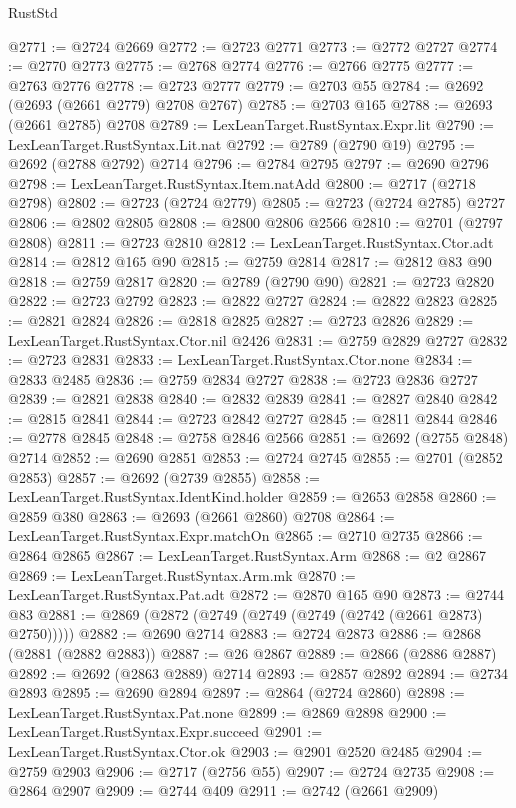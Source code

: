 \begin{lexlean}{RustStd}
\begin{coremodule}
{\begin{coremodule}
{{{{{{{{{{{{{{{{{{{{{{{{{{{{{{{{{{{{{{{@2771 := @2724 @2669
@2772 := @2723 @2771
@2773 := @2772 @2727
@2774 := @2770 @2773
@2775 := @2768 @2774
@2776 := @2766 @2775
@2777 := @2763 @2776
@2778 := @2723 @2777
@2779 := @2703 @55
@2784 := @2692 (@2693 (@2661 @2779) @2708 @2767)
@2785 := @2703 @165
@2788 := @2693 (@2661 @2785) @2708
@2789 := LexLeanTarget.RustSyntax.Expr.lit
@2790 := LexLeanTarget.RustSyntax.Lit.nat
@2792 := @2789 (@2790 @19)
@2795 := @2692 (@2788 @2792) @2714
@2796 := @2784 @2795
@2797 := @2690 @2796
@2798 := LexLeanTarget.RustSyntax.Item.natAdd
@2800 := @2717 (@2718 @2798)
@2802 := @2723 (@2724 @2779)
@2805 := @2723 (@2724 @2785) @2727
@2806 := @2802 @2805
@2808 := @2800 @2806 @2566
@2810 := @2701 (@2797 @2808)
@2811 := @2723 @2810
@2812 := LexLeanTarget.RustSyntax.Ctor.adt
@2814 := @2812 @165 @90
@2815 := @2759 @2814
@2817 := @2812 @83 @90
@2818 := @2759 @2817
@2820 := @2789 (@2790 @90)
@2821 := @2723 @2820
@2822 := @2723 @2792
@2823 := @2822 @2727
@2824 := @2822 @2823
@2825 := @2821 @2824
@2826 := @2818 @2825
@2827 := @2723 @2826
@2829 := LexLeanTarget.RustSyntax.Ctor.nil @2426
@2831 := @2759 @2829 @2727
@2832 := @2723 @2831
@2833 := LexLeanTarget.RustSyntax.Ctor.none
@2834 := @2833 @2485
@2836 := @2759 @2834 @2727
@2838 := @2723 @2836 @2727
@2839 := @2821 @2838
@2840 := @2832 @2839
@2841 := @2827 @2840
@2842 := @2815 @2841
@2844 := @2723 @2842 @2727
@2845 := @2811 @2844
@2846 := @2778 @2845
@2848 := @2758 @2846 @2566
@2851 := @2692 (@2755 @2848) @2714
@2852 := @2690 @2851
@2853 := @2724 @2745
@2855 := @2701 (@2852 @2853)
@2857 := @2692 (@2739 @2855)
@2858 := LexLeanTarget.RustSyntax.IdentKind.holder
@2859 := @2653 @2858
@2860 := @2859 @380
@2863 := @2693 (@2661 @2860) @2708
@2864 := LexLeanTarget.RustSyntax.Expr.matchOn
@2865 := @2710 @2735
@2866 := @2864 @2865
@2867 := LexLeanTarget.RustSyntax.Arm
@2868 := @2 @2867
@2869 := LexLeanTarget.RustSyntax.Arm.mk
@2870 := LexLeanTarget.RustSyntax.Pat.adt
@2872 := @2870 @165 @90
@2873 := @2744 @83
@2881 := @2869 (@2872 (@2749 (@2749 (@2749 (@2742 (@2661 @2873) @2750)))))
@2882 := @2690 @2714
@2883 := @2724 @2873
@2886 := @2868 (@2881 (@2882 @2883))
@2887 := @26 @2867
@2889 := @2866 (@2886 @2887)
@2892 := @2692 (@2863 @2889) @2714
@2893 := @2857 @2892
@2894 := @2734 @2893
@2895 := @2690 @2894
@2897 := @2864 (@2724 @2860)
@2898 := LexLeanTarget.RustSyntax.Pat.none
@2899 := @2869 @2898
@2900 := LexLeanTarget.RustSyntax.Expr.succeed
@2901 := LexLeanTarget.RustSyntax.Ctor.ok
@2903 := @2901 @2520 @2485
@2904 := @2759 @2903
@2906 := @2717 (@2756 @55)
@2907 := @2724 @2735
@2908 := @2864 @2907
@2909 := @2744 @409
@2911 := @2742 (@2661 @2909)
}}}}}}}}}}}}}}}}}}}}}}}}}}}}}}}}}}}}}}}
\end{coremodule}}
\end{coremodule}
\end{lexlean}
